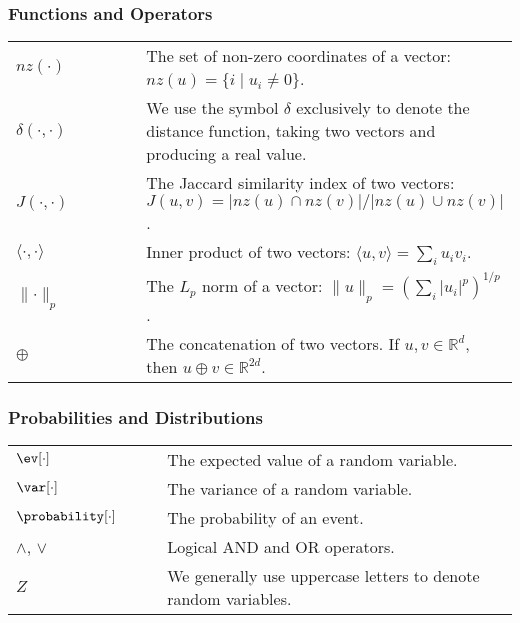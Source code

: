 \subsubsection*{Functions and Operators}
\begin{longtable*}{p{0.3\linewidth}p{0.7\linewidth}}
$\mathit{nz}(\cdot)$ & The set of non-zero coordinates of a vector: $\mathit{nz}(u) = \{ i \;|\; u_i \neq 0 \}$. \\
$\delta(\cdot, \cdot)$ & We use the symbol $\delta$ exclusively to denote the distance function,
taking two vectors and producing a real value. \\
$J(\cdot, \cdot)$ & The Jaccard similarity index of two vectors: $J(u, v) = \lvert \mathit{nz}(u) \cap \mathit{nz}(v) \rvert / \lvert \mathit{nz}(u) \cup \mathit{nz}(v) \rvert$. \\
$\langle \cdot, \cdot \rangle$ & Inner product of two vectors: $\langle u, v \rangle = \sum_i u_i v_i$. \\
$\lVert \cdot \rVert_p$ & The $L_p$ norm of a vector: $\lVert u \rVert_p = (\sum_i \lvert u_i \rvert^p)^{1/p}$. \\
$\oplus$ & The concatenation of two vectors. If $u, v \in \mathbb{R}^d$, then $u \oplus v \in \mathbb{R}^{2d}$. \\
\end{longtable*}

\subsubsection*{Probabilities and Distributions}
\begin{longtable*}{p{0.3\linewidth}p{0.7\linewidth}}
$\ev[\cdot]$ & The expected value of a random variable. \\
$\var[\cdot]$ & The variance of a random variable. \\
$\probability[\cdot]$ & The probability of an event. \\
$\land$, $\lor$ & Logical AND and OR operators. \\
$Z$ & We generally use uppercase letters to denote random variables. \\
\end{longtable*}
